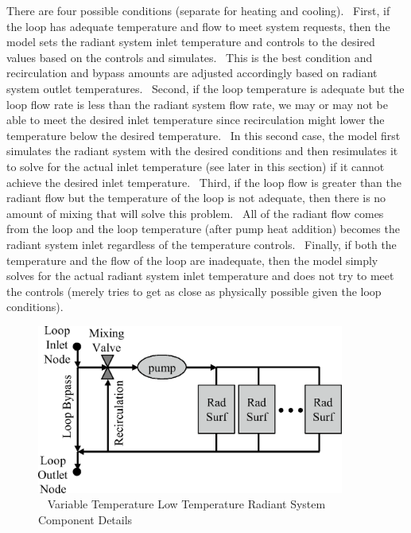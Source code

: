There are four possible conditions (separate for heating and cooling).~ First, if the loop has adequate temperature and flow to meet system requests, then the model sets the radiant system inlet temperature and controls to the desired values based on the controls and simulates.~ This is the best condition and recirculation and bypass amounts are adjusted accordingly based on radiant system outlet temperatures.~ Second, if the loop temperature is adequate but the loop flow rate is less than the radiant system flow rate, we may or may not be able to meet the desired inlet temperature since recirculation might lower the temperature below the desired temperature.~ In this second case, the model first simulates the radiant system with the desired conditions and then resimulates it to solve for the actual inlet temperature (see later in this section) if it cannot achieve the desired inlet temperature.~ Third, if the loop flow is greater than the radiant flow but the temperature of the loop is not adequate, then there is no amount of mixing that will solve this problem.~ All of the radiant flow comes from the loop and the loop temperature (after pump heat addition) becomes the radiant system inlet regardless of the temperature controls.~ Finally, if both the temperature and the flow of the loop are inadequate, then the model simply solves for the actual radiant system inlet temperature and does not try to meet the controls (merely tries to get as close as physically possible given the loop conditions).

\begin{figure}[hbtp] %
\centering
\includegraphics[width=0.9\textwidth, height=0.9\textheight, keepaspectratio=true]{media/image6055.png}
\caption{  Variable Temperature Low Temperature Radiant System Component Details \protect \label{fig:variable-temperature-low-temperature-radiant-001}}
\end{figure}

